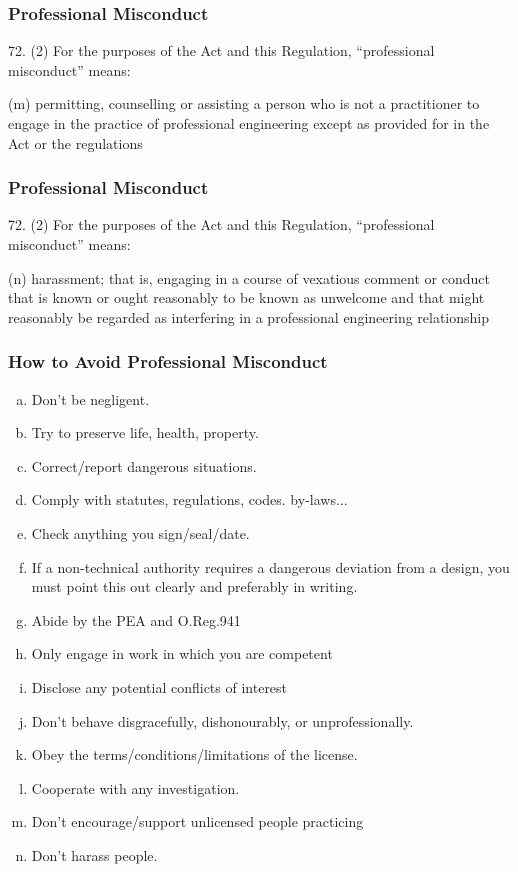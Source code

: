 \begin{frame}
\frametitle{Professional Misconduct}

72. (2) For the purposes of the Act and this Regulation, ``professional misconduct'' means:

(m) permitting, counselling or assisting a person who is not a 	practitioner to engage in the practice of professional 	engineering except as provided for in the Act or the regulations

\end{frame}


\begin{frame}
\frametitle{Professional Misconduct}

72. (2) For the purposes of the Act and this Regulation, ``professional misconduct'' means:

(n) harassment; that is, engaging in a course of vexatious 	comment or conduct that is known or ought reasonably to be 	known as unwelcome and that might reasonably be regarded 	as interfering in a professional engineering relationship

\end{frame}



\begin{frame}
\frametitle{How to Avoid Professional Misconduct}
\begin{enumerate}[(a)]

	\item Don't be negligent.
	\item Try to preserve life, health, property.
	\item Correct/report dangerous situations.
	\item Comply with statutes, regulations, codes. by-laws...
	\item Check anything you sign/seal/date.
	\item If a non-technical authority requires a dangerous deviation from
a design, you must point this out clearly and preferably in writing.
	\item Abide by the PEA and O.Reg.941
	\item Only engage in work in which you are competent
	\item Disclose any potential conflicts of interest
	\item Don't behave disgracefully, dishonourably, or unprofessionally.
	\item Obey the terms/conditions/limitations of the license. 
	\item Cooperate with any investigation.
	\item Don't encourage/support unlicensed people practicing
	\item Don't harass people.
\end{enumerate}

\end{frame}





